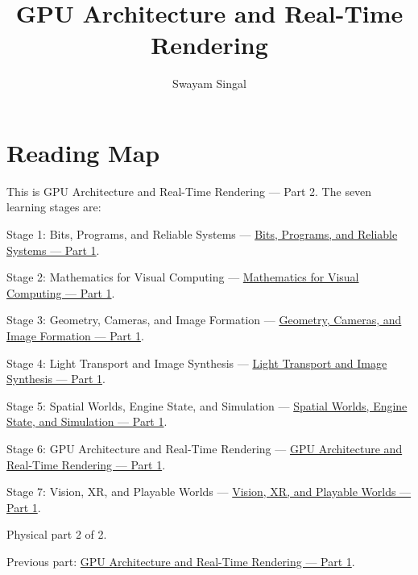 \documentclass[11pt,twoside,openany]{book}
\title{GPU Architecture and Real-Time Rendering}
\author{Swayam Singal}
\begin{document}
\maketitle
\begin{center}\end{center}
\chapter*{Reading Map}
\hypertarget{volume-reading-map}{}
\noindent This is GPU Architecture and Real-Time Rendering --- Part 2. The seven learning stages are:
\par\noindent Stage 1: Bits, Programs, and Reliable Systems --- \href{../01-Bits-Programs-and-Reliable-Systems-P01/main.pdf}{Bits, Programs, and Reliable Systems — Part 1}.
\par\noindent Stage 2: Mathematics for Visual Computing --- \href{../02-Mathematics-for-Visual-Computing-P01/main.pdf}{Mathematics for Visual Computing — Part 1}.
\par\noindent Stage 3: Geometry, Cameras, and Image Formation --- \href{../03-Geometry-Cameras-and-Image-Formation-P01/main.pdf}{Geometry, Cameras, and Image Formation — Part 1}.
\par\noindent Stage 4: Light Transport and Image Synthesis --- \href{../04-Light-Transport-and-Image-Synthesis-P01/main.pdf}{Light Transport and Image Synthesis — Part 1}.
\par\noindent Stage 5: Spatial Worlds, Engine State, and Simulation --- \href{../05-Spatial-Worlds-Engine-State-and-Simulation-P01/main.pdf}{Spatial Worlds, Engine State, and Simulation — Part 1}.
\par\noindent Stage 6: GPU Architecture and Real-Time Rendering --- \href{../06-GPU-Architecture-and-Real-Time-Rendering-P01/main.pdf}{GPU Architecture and Real-Time Rendering — Part 1}.
\par\noindent Stage 7: Vision, XR, and Playable Worlds --- \href{../07-Vision-XR-and-Playable-Worlds-P01/main.pdf}{Vision, XR, and Playable Worlds — Part 1}.
\par\noindent Physical part 2 of 2.
\par\noindent Previous part: \href{../06-GPU-Architecture-and-Real-Time-Rendering-P01/main.pdf}{GPU Architecture and Real-Time Rendering — Part 1}.
\tableofcontents
\mainmatter
\setcounter{chapter}{10}

\end{document}

